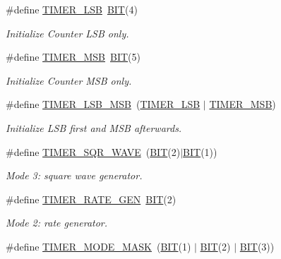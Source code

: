 \begin{DoxyCompactItemize}
\#define \mbox{\hyperlink{group__i8254_gac18cb814ebd0d67235392c330e0e3504}{T\+I\+M\+E\+R\+\_\+\+L\+SB}}~\mbox{\hyperlink{group__uart_ga3a8ea58898cb58fc96013383d39f482c}{B\+IT}}(4)
\begin{DoxyCompactList}\small\item\em Initialize Counter L\+SB only. \end{DoxyCompactList}\item 
\#define \mbox{\hyperlink{group__i8254_ga2a8a6d363c612d756cd8d78480f7cd04}{T\+I\+M\+E\+R\+\_\+\+M\+SB}}~\mbox{\hyperlink{group__uart_ga3a8ea58898cb58fc96013383d39f482c}{B\+IT}}(5)
\begin{DoxyCompactList}\small\item\em Initialize Counter M\+SB only. \end{DoxyCompactList}\item 
\#define \mbox{\hyperlink{group__i8254_ga8c0f1933323274c765e23837e4fbc8c7}{T\+I\+M\+E\+R\+\_\+\+L\+S\+B\+\_\+\+M\+SB}}~(\mbox{\hyperlink{group__i8254_gac18cb814ebd0d67235392c330e0e3504}{T\+I\+M\+E\+R\+\_\+\+L\+SB}} $\vert$ \mbox{\hyperlink{group__i8254_ga2a8a6d363c612d756cd8d78480f7cd04}{T\+I\+M\+E\+R\+\_\+\+M\+SB}})
\begin{DoxyCompactList}\small\item\em Initialize L\+SB first and M\+SB afterwards. \end{DoxyCompactList}\item 
\#define \mbox{\hyperlink{group__i8254_ga4745cbf21da3d3fea5dbb080b2b73bac}{T\+I\+M\+E\+R\+\_\+\+S\+Q\+R\+\_\+\+W\+A\+VE}}~(\mbox{\hyperlink{group__uart_ga3a8ea58898cb58fc96013383d39f482c}{B\+IT}}(2)$\vert$\mbox{\hyperlink{group__uart_ga3a8ea58898cb58fc96013383d39f482c}{B\+IT}}(1))
\begin{DoxyCompactList}\small\item\em Mode 3\+: square wave generator. \end{DoxyCompactList}\item 
\#define \mbox{\hyperlink{group__i8254_ga5d4449e0fa1cf4a4d107a48a04a1265f}{T\+I\+M\+E\+R\+\_\+\+R\+A\+T\+E\+\_\+\+G\+EN}}~\mbox{\hyperlink{group__uart_ga3a8ea58898cb58fc96013383d39f482c}{B\+IT}}(2)
\begin{DoxyCompactList}\small\item\em Mode 2\+: rate generator. \end{DoxyCompactList}\item 
\#define \mbox{\hyperlink{group__i8254_ga66c52532109109a0eb8ba3f8f562d90a}{T\+I\+M\+E\+R\+\_\+\+M\+O\+D\+E\+\_\+\+M\+A\+SK}}~(\mbox{\hyperlink{group__uart_ga3a8ea58898cb58fc96013383d39f482c}{B\+IT}}(1) $\vert$ \mbox{\hyperlink{group__uart_ga3a8ea58898cb58fc96013383d39f482c}{B\+IT}}(2) $\vert$ \mbox{\hyperlink{group__uart_ga3a8ea58898cb58fc96013383d39f482c}{B\+IT}}(3))

\end{DoxyCompactItemize}

